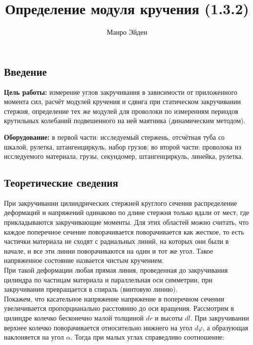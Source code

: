 \documentclass[a4paper, 12pt]{article}
\title{\textbf{Определение модуля кручения (1.3.2)}}
\author{Манро Эйден}
\date{}
\begin{document}
\maketitle
	      	
    \begin{center}
    \section*{Введение}    
    \end{center}


    \noindent \textbf{Цель работы:} измерение углов закручивания в зависимости от приложенного момента сил, расчёт модулей кручения и сдвига при статическом закручивании стержня, определение тех же модулей для проволоки по измерениям периодов крутильных колебаний подвешенного на ней маятника (динамическим методом).

    \bigskip

    \noindent \textbf{Оборудование:} в первой части: исследуемый стержень, отсчётная туба со шкалой, рулетка, штангенциркуль, набор грузов; во второй части: проволока из исследуемого материала, грузы, секундомер, штангенциркуль, линейка, рулетка.
    
    \bigskip

    \begin{center}    
    \subsection*{Теоретические сведения}
    \end{center}
    
    При закручивании цилиндрических стержней круглого сечения распределение деформаций
    и напряжений одинаково по длине стержня только вдали от мест, где прикладываются закручивающие моменты.
    Для этих областей можно считать, что каждое поперечное сечение поворачивается поворачивается как жесткое,
    то есть частички материала не сходят с радиальных линий, на которых они были в начале, и все
    эти линии поворачиваются на один и тот же угол. Такое напряженное состояние назвается чистым кручением.\\

    При такой деформации любая прямая линия, проведенная до закручивания цилиндра по частицам материала и параллельная оси симметрии,
    при закручивании превращается в спираль (винтовую линию). \\

    Покажем, что касательное напряжение напряжение в поперечном сечении увеличивается пропорцианально расстоянию до оси вращения.
    Рассмотрим в цилиндре колечко бесконечно малой толщиной $dr$ и высоты $dl$. При закручивании верхнее колечко поворачивается относительно 
    нижнего на угол $d\varphi$, а образующая наклоняется на угол $\alpha$. Тогда при малых углах справедливо соотношение:
\end{document}
